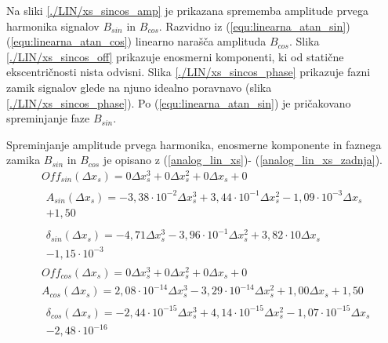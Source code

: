Na sliki \ref{./LIN/xs_sincos_amp} je prikazana sprememba amplitude prvega harmonika signalov $B_{sin}$ in $B_{cos}$. Razvidno iz (\ref{equ:linearna_atan_sin})  (\ref{equ:linearna_atan_cos}) linearno narašča amplituda $B_{cos}$. Slika \ref{./LIN/xs_sincos_off} prikazuje enosmerni komponenti, ki od statične ekscentričnosti nista odvisni. Slika \ref{./LIN/xs_sincos_phase} prikazuje fazni zamik signalov glede na njuno idealno poravnavo (slika \ref{./LIN/xs_sincos_phase}). Po (\ref{equ:linearna_atan_sin}) je pričakovano spreminjanje faze $B_{sin}$.

Spreminjanje amplitude prvega harmonika, enosmerne komponente in faznega zamika $B_{sin}$ in $B_{cos}$ je opisano z (\ref{analog_lin_xs})- (\ref{analog_lin_xs_zadnja}). 
\begin{eqnarray}
\label{analog_lin_xs}
&Off_{sin}(\Delta x_s) = 0\Delta x_s^{3}+0\Delta x_s^{2}+0\Delta x_s+0 \\       
&\begin{split}A_{sin}(\Delta x_s) =-3,38\cdot 10^{-2}\Delta x_s^{3}+3,44\cdot 10^{-1}\Delta x_s^{2}-1,09\cdot 10^{-3}\Delta x_s\\+1,50 \end{split}\\                      
& \begin{split}\delta_{sin}(\Delta x_s) =-4,71\Delta x_s^{3}-3,96\cdot 10^{-1}\Delta x_s^{2}+3,82\cdot 10\Delta x_s\\-1,15\cdot 10^{-3}  \end{split}\\                             
&Off_{cos}(\Delta x_s) = 0\Delta x_s^{3}+0\Delta x_s^{2}+0\Delta x_s+0 \\       
&A_{cos}(\Delta x_s) =2,08\cdot 10^{-14}\Delta x_s^{3}-3,29\cdot 10^{-14}\Delta x_s^{2}+1,00\Delta x_s+1,50 \\ 
\label{analog_lin_xs_zadnja}                              
&\begin{split}\delta_{cos}(\Delta x_s) =-2,44\cdot 10^{-15}\Delta x_s^{3}+4,14\cdot 10^{-15}\Delta x_s^{2}-1,07\cdot 10^{-15}\Delta x_s\\-2,48\cdot 10^{-16} \end{split}
\end{eqnarray}
